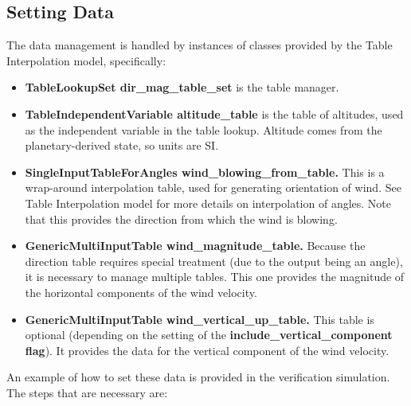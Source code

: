 \documentclass[11pt,fleqn]{report}
\begin{document}
\subsection{Setting Data}
The data management is handled by instances of classes provided by the Table Interpolation model, specifically:
\begin{itemize}
   \item \textbf{TableLookupSet dir\_mag\_table\_set} is the table manager.
   \item \textbf{TableIndependentVariable altitude\_table} is the table of altitudes, used as the independent variable in the table lookup.  Altitude comes from the planetary-derived state, so units are SI.
   \item \textbf{SingleInputTableForAngles wind\_blowing\_from\_table.}  This is a wrap-around interpolation table, used for generating orientation of wind. See Table Interpolation model for more details on interpolation of angles.  Note that this provides the direction from which the wind is blowing.
   \item \textbf{GenericMultiInputTable wind\_magnitude\_table.}  Because the direction table requires special treatment (due to the output being an angle), it is necessary to manage multiple tables.  This one provides the magnitude of the horizontal components of the wind velocity.
   \item \textbf{GenericMultiInputTable wind\_vertical\_up\_table.} This table is optional (depending on the setting of the \textbf{include\_vertical\_component flag}).  It provides the data for the vertical component of the wind velocity.
\end{itemize}
An example of how to set these data is provided in the verification simulation.  The steps that are necessary are:
\end{document}

